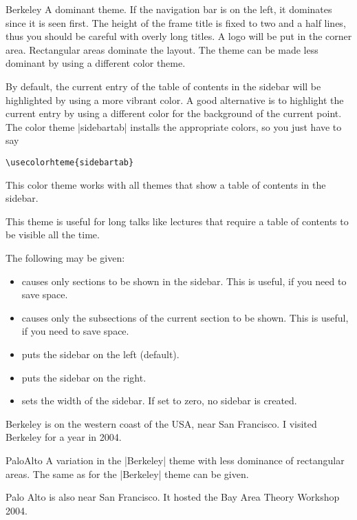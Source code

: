 \begin{themeexample}{Berkeley}
  A dominant theme. If the navigation bar is on the left, it dominates since it is seen first. The height of the frame title is fixed to two and a half lines, thus you should be careful with overly long titles. A logo will be put in the corner area. Rectangular areas dominate the layout. The theme can be made less dominant by using a different color theme.

  By default, the current entry of the table of contents in the sidebar will be highlighted by using a more vibrant color. A good alternative is to highlight the current entry by using a different color for the background of the current point. The color theme |sidebartab| installs the appropriate colors, so you just have to say
\begin{verbatim}
\usecolorhteme{sidebartab}
\end{verbatim}
  This color theme works with all themes that show a table of contents in the sidebar.

  This theme is useful for long talks like lectures that require a table of contents to be visible all the time.

  The following  may be given:
  \begin{itemize}
  \item {} causes only sections to be shown in the sidebar. This is useful, if you need to save space.
  \item {} causes only the subsections of the current section to be shown. This is useful, if you need to save space.
  \item {} puts the sidebar on the left (default).
  \item {} puts the sidebar on the right.
  \item {} sets the width of the sidebar. If set to zero, no sidebar is created.
  \end{itemize}

  Berkeley is on the western coast of the USA, near San Francisco. I visited Berkeley for a year in 2004.
\end{themeexample}

\begin{themeexample}{PaloAlto}
  A variation in the |Berkeley| theme with less dominance of rectangular areas. The same  as for the |Berkeley| theme can be given.

  Palo Alto is also near San Francisco. It hosted the Bay Area Theory Workshop 2004.
\end{themeexample}

